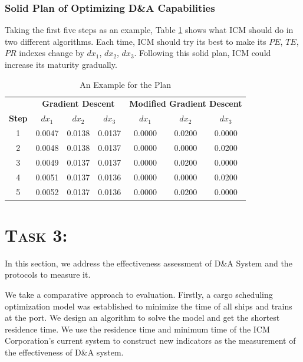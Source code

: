 \documentclass{mcmthesis}
\begin{document}
\subsubsection{Solid Plan of Optimizing D\&A Capabilities}
Taking the first five steps as an example, Table \ref{table::example} shows what ICM should do in two different algorithms. Each time, ICM should try its best to make its $PE$, $TE$, $PR$ indexes change by $dx_1$, $dx_2$, $dx_3$. Following this solid plan, ICM could increase its maturity gradually.

\begin{table}[!htbp]
    \small
    \setlength{\abovecaptionskip}{0cm}
    \setlength{\belowcaptionskip}{+0.1cm}
    \caption{An Example for the Plan}
    \label{table::example}
    \centering
    \begin{tabular}{ccccccc}  
    \toprule   
    \ & \multicolumn{3}{c}{\textbf{Gradient Descent}} & \multicolumn{3}{c}{\textbf{Modified Gradient Descent}} \\
    \textbf{Step} & $dx_1$ & $dx_2$ & $dx_3$ & $dx_1$ & $dx_2$ & $dx_3$ \\
    \midrule
    1 & 0.0047 & 0.0138 & 0.0137 & 0.0000 & 0.0200 & 0.0000\\
    2 & 0.0048 & 0.0138 & 0.0137 & 0.0000 & 0.0000 & 0.0200\\
    3 & 0.0049 & 0.0137 & 0.0137 & 0.0000 & 0.0200 & 0.0000\\
    4 & 0.0051 & 0.0137 & 0.0136 & 0.0000 & 0.0000 & 0.0200\\
    5 & 0.0052 & 0.0137 & 0.0136 & 0.0000 & 0.0200 & 0.0000\\
    \bottomrule  
    \end{tabular}
\end{table}

\section{\scshape{Task 3:} }
In this section, we address the effectiveness assessment of D\&A System and the protocols to measure it. 

We take a comparative approach to evaluation. Firstly, a cargo scheduling optimization model was established to minimize the time of all ships and trains at the port. We design an algorithm to solve the model and get the shortest residence time. We use the residence time and minimum time of the ICM Corporation's current system to construct new indicators as the measurement of the effectiveness of D\&A system.
\end{document}

